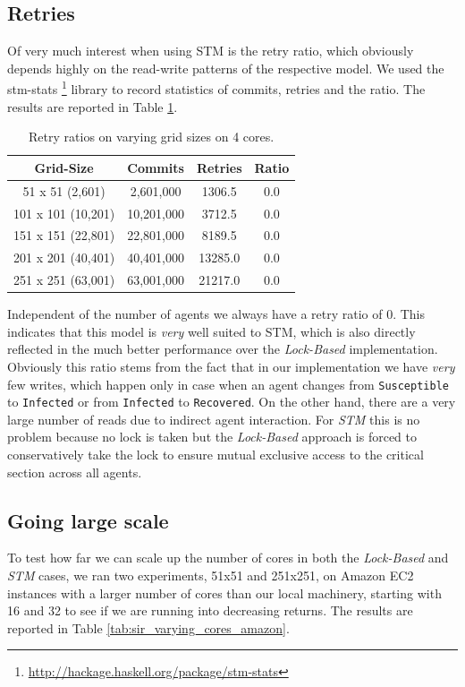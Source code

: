 \subsection{Retries}
Of very much interest when using STM is the retry ratio, which obviously depends highly on the read-write patterns of the respective model. We used the stm-stats \footnote{\url{http://hackage.haskell.org/package/stm-stats}} library to record statistics of commits, retries and the ratio. The results are reported in Table \ref{tab:retries_stm}.

\begin{table}
	\centering
  	\begin{tabular}{ c || c | c | c }
        Grid-Size 		   & Commits    & Retries & Ratio \\ \hline \hline 
   		51 x 51 (2,601)    & 2,601,000  & 1306.5  & 0.0 \\ \hline
   		101 x 101 (10,201) & 10,201,000 & 3712.5  & 0.0 \\ \hline
   		151 x 151 (22,801) & 22,801,000 & 8189.5  & 0.0 \\ \hline
   		201 x 201 (40,401) & 40,401,000 & 13285.0 & 0.0 \\ \hline 
   		251 x 251 (63,001) & 63,001,000 & 21217.0 & 0.0 \\ \hline \hline
  	\end{tabular}
  	
  	\caption{Retry ratios on varying grid sizes on 4 cores.}
	\label{tab:retries_stm}
\end{table}

Independent of the number of agents we always have a retry ratio of 0. This indicates that this model is \textit{very} well suited to STM, which is also directly reflected in the much better performance over the \textit{Lock-Based} implementation. Obviously this ratio stems from the fact that in our implementation we have \textit{very} few writes, which happen only in case when an agent changes from \texttt{Susceptible} to \texttt{Infected} or from \texttt{Infected} to \texttt{Recovered}. On the other hand, there are a very large number of reads due to indirect agent interaction. For \textit{STM} this is no problem because no lock is taken but the \textit{Lock-Based} approach is forced to conservatively take the lock to ensure mutual exclusive access to the critical section across all agents.

\subsection{Going large scale}
To test how far we can scale up the number of cores in both the \textit{Lock-Based} and \textit{STM} cases, we ran two experiments, 51x51 and 251x251, on Amazon EC2 instances with a larger number of cores than our local machinery, starting with 16 and 32 to see if we are running into decreasing returns. The results are reported in Table \ref{tab:sir_varying_cores_amazon}.

